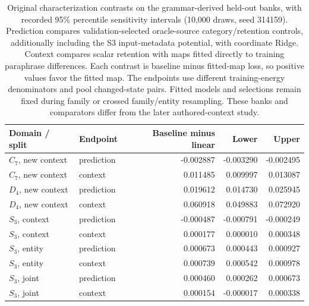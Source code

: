 \begin{table}[htbp]
\caption{Original characterization contrasts on the grammar-derived held-out banks, with recorded 95\% percentile sensitivity intervals (10,000 draws, seed 314159). Prediction compares validation-selected oracle-source category/retention controls, additionally including the S3 input-metadata potential, with coordinate Ridge. Context compares scalar retention with maps fitted directly to training paraphrase differences. Each contrast is baseline minus fitted-map loss, so positive values favor the fitted map. The endpoints use different training-energy denominators and pool changed-state pairs. Fitted models and selections remain fixed during family or crossed family/entity resampling. These banks and comparators differ from the later authored-context study.}
\label{tab:characterization-intervals}\centering\small
\begin{tabular}{llrrr}\toprule
Domain / split & Endpoint & Baseline minus linear & Lower & Upper \\
\midrule
$C_7$, new context & prediction & -0.002887 & -0.003290 & -0.002495 \\
$C_7$, new context & context & 0.011485 & 0.009997 & 0.013087 \\
$D_4$, new context & prediction & 0.019612 & 0.014730 & 0.025945 \\
$D_4$, new context & context & 0.060918 & 0.049883 & 0.072920 \\
$S_3$, context & prediction & -0.000487 & -0.000791 & -0.000249 \\
$S_3$, context & context & 0.000177 & 0.000010 & 0.000348 \\
$S_3$, entity & prediction & 0.000673 & 0.000443 & 0.000927 \\
$S_3$, entity & context & 0.000739 & 0.000542 & 0.000978 \\
$S_3$, joint & prediction & 0.000460 & 0.000262 & 0.000673 \\
$S_3$, joint & context & 0.000154 & -0.000017 & 0.000338 \\
\bottomrule\end{tabular}
\end{table}
